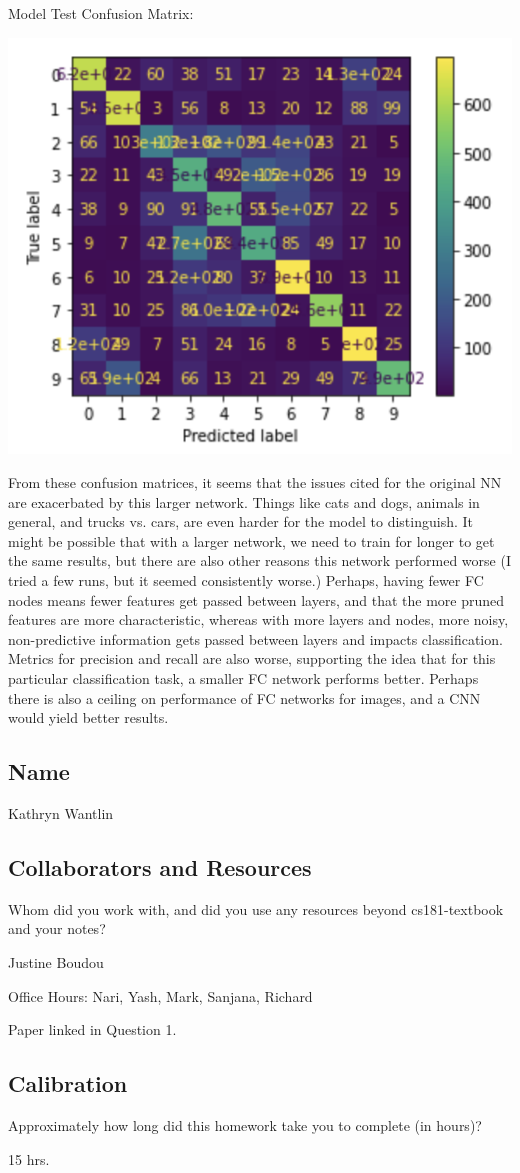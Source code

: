 \documentclass[submit]{harvardml}
\begin{document}
\begin{enumerate}
Model Test Confusion Matrix:

\includegraphics[width=.7\textwidth]{newtestconfusion.png}

From these confusion matrices, it seems that the issues cited for the original NN are exacerbated by this larger network. Things like cats and dogs, animals in general, and trucks vs. cars, are even harder for the model to distinguish. It might be possible that with a larger network, we need to train for longer to get the same results, but there are also other reasons this network performed worse (I tried a few runs, but it seemed consistently worse.) Perhaps, having fewer FC nodes means fewer features get passed between layers, and that the more pruned features are more characteristic, whereas with more layers and nodes, more noisy, non-predictive information gets passed between layers and impacts classification. Metrics for precision and recall are also worse, supporting the idea that for this particular classification task, a smaller FC network performs better. Perhaps there is also a ceiling on performance of FC networks for images, and a CNN would yield better results. 

\end{enumerate}
\newpage
\subsection*{Name}

Kathryn Wantlin

\subsection*{Collaborators and Resources}
Whom did you work with, and did you use any resources beyond cs181-textbook and your notes?

Justine Boudou

Office Hours: Nari, Yash, Mark, Sanjana, Richard

Paper linked in Question 1.

\subsection*{Calibration}
Approximately how long did this homework take you to complete (in hours)? 

15 hrs.
\end{document}
